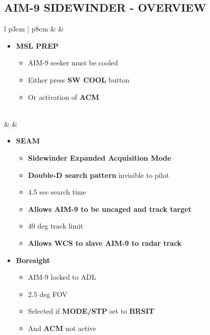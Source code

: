 \documentclass[8pt,usenames,dvipsnames,twoside]{article}
\begin{document}
		\subsection{AIM-9 SIDEWINDER - OVERVIEW}
		\begin{center}
			\begin{longtable}{l p{3cm} | p{8cm}}
				\toprule
				\textbullet &  & 
				\begin{minipage}[t]{\linewidth}
					\vspace{-7pt}
					\begin{itemize}
						\item \textbf{MSL PREP}
						\begin{itemize}
							\item AIM-9 seeker must be cooled
							\item Either press \textbf{SW COOL} button
							\item Or activation of \textbf{ACM}
						\end{itemize} 
					\end{itemize} 
				\end{minipage} \\
				\midrule
				\textbullet &  & 
				\begin{minipage}[t]{\linewidth}
					\vspace{-7pt}
					\begin{itemize}
						\item \textbf{SEAM} 
						\begin{itemize}
							\item \textbf{Sidewinder Expanded Acquisition Mode}
							\item \textbf{Double-D search pattern} invisible to pilot
							\item 4.5 sec search time
							\item \textbf{Allows AIM-9 to be uncaged and track target}
							\item 40 deg track limit
							\item \textbf{Allows WCS to slave AIM-9 to radar track}
						\end{itemize}
						\item \textbf{Boresight}
						\begin{itemize}
							\item AIM-9 locked to ADL
							\item 2.5 deg FOV
							\item Selected if  \textbf{MODE/STP} set to \textbf{BRSIT}
							\item And \textbf{ACM} not active

\end{itemize}
\end{itemize}
\end{minipage}
\end{longtable}
\end{center}
\end{document}
